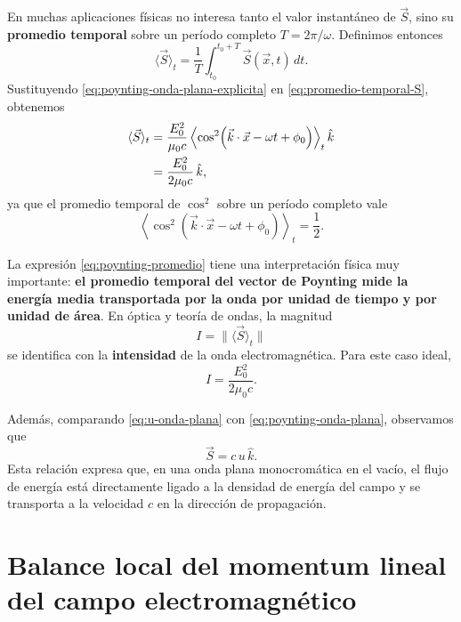 \documentclass[../main.tex]{subfiles}
\begin{document}
En muchas aplicaciones físicas no interesa tanto el valor instantáneo de \(\vec S\), sino su \textbf{promedio temporal} sobre un período completo \(T=2\pi/\omega\). Definimos entonces
\begin{equation}
    \langle \vec S\rangle_t
    =
    \frac{1}{T}\int_{t_0}^{t_0+T}\vec S(\vec x,t)\,dt.
    \label{eq:promedio-temporal-S}
\end{equation}
Sustituyendo \eqref{eq:poynting-onda-plana-explicita} en \eqref{eq:promedio-temporal-S}, obtenemos
\begin{align}
    \langle \vec S\rangle_t
    &=
    \frac{E_0^2}{\mu_0 c}
    \left\langle
    \cos^2\!\left(\vec k\cdot\vec x-\omega t+\phi_0\right)
    \right\rangle_t
    \hat k \notag\\
    &=
    \frac{E_0^2}{2\mu_0 c}\,\hat k,
    \label{eq:poynting-promedio}
\end{align}
ya que el promedio temporal de \(\cos^2\) sobre un período completo vale
\begin{equation*}
    \left\langle
    \cos^2\!\left(\vec k\cdot\vec x-\omega t+\phi_0\right)
    \right\rangle_t
    =\frac{1}{2}.
\end{equation*}

La expresión \eqref{eq:poynting-promedio} tiene una interpretación física muy importante: \textbf{el promedio temporal del vector de Poynting mide la energía media transportada por la onda por unidad de tiempo y por unidad de área}. En óptica y teoría de ondas, la magnitud
\begin{equation*}
    I=\|\langle \vec S\rangle_t\|
\end{equation*}
se identifica con la \textbf{intensidad} de la onda electromagnética. Para este caso ideal,
\begin{equation*}
    I=\frac{E_0^2}{2\mu_0 c}.
\end{equation*}

Además, comparando \eqref{eq:u-onda-plana} con \eqref{eq:poynting-onda-plana}, observamos que
\begin{equation*}
    \vec S=c\,u\,\hat k.
\end{equation*}
Esta relación expresa que, en una onda plana monocromática en el vacío, el flujo de energía está directamente ligado a la densidad de energía del campo y se transporta a la velocidad \(c\) en la dirección de propagación.

\section{Balance local del momentum lineal del campo electromagnético}
\end{document}
